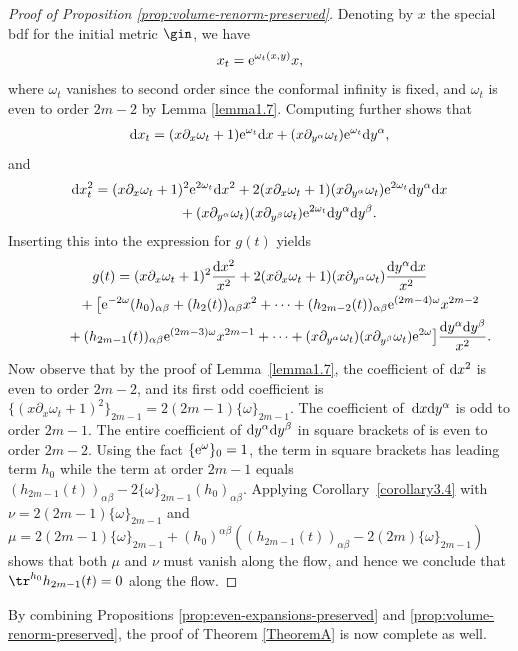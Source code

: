 \begin{proof}[Proof of Proposition \ref{prop:volume-renorm-preserved}]
Denoting by $x$ the special bdf for the initial metric $\gin$, we have
\begin{gather*}%
x_t = {\rm e}^{\omega_t(x,y)} x,
\end{gather*}
where $\omega_t$ vanishes to second order since the conformal infinity is fixed, and $\omega_t$ is even to order $2m-2$ by Lemma \ref{lemma1.7}.
Computing further shows that
\begin{gather*}%
{\rm d}x_t = (x\partial_x \omega_t + 1) {\rm e}^{\omega_t} {\rm d}x + (x \partial_{y^{\alpha}} \omega_t) {\rm e}^{\omega_t} {\rm d}y^{\alpha} ,
\end{gather*}
and
\begin{gather*}%
{\rm d}x_t^2 = (x\partial_x \omega_t + 1)^2 {\rm e}^{2\omega_t} {\rm d}x^2 + 2(x\partial_x \omega_t + 1) (x \partial_{y^{\alpha}} \omega_t)
{\rm e}^{2\omega_t} {\rm d}y^{\alpha} {\rm d}x\\
\hphantom{{\rm d}x_t^2 =}{} + (x \partial_{y^{\alpha}} \omega_t) (x \partial_{y^{\beta}} \omega_t) {\rm e}^{2\omega_t} {\rm d}y^{\alpha} {\rm d}y^{\beta}.
\end{gather*}
Inserting this into the expression for $g(t)$ yields
\begin{gather*}%
g(t) = ( x\partial_x \omega_t + 1)^2 \frac{{\rm d}x^2}{x^2} + 2( x\partial_x \omega_t + 1)( x \partial_{y^{\alpha}} \omega_t) \frac{{\rm d}y^{\alpha} {\rm d}x}{x^2} \\
\hphantom{g(t) =}{} + \big[ {\rm e}^{-2\omega} (h_0)_{\alpha \beta} + (h_2(t))_{\alpha \beta} x^2 + \cdots + (h_{2m-2}(t))_{\alpha \beta} {\rm e}^{(2m-4)\omega} x^{2m-2}\\
\hphantom{g(t) =}{} + (h_{2m-1}(t))_{\alpha \beta} {\rm e}^{(2m-3)\omega} x^{2m-1} + \cdots + (x \partial_{y^{\alpha}} \omega_t) (x \partial_{y^{\beta}} \omega_t) {\rm e}^{2\omega} \big] \frac{{\rm d}y^{\alpha} {\rm d}y^{\beta}}{x^2} .
\end{gather*}
Now observe that by the proof of Lemma~\ref{lemma1.7}, the coefficient of ${\rm d}x^2$ is even to order $2m-2$, and its first odd coefficient is $
\big\{ ( x\partial_x \omega_t + 1)^2 \big\}_{2m-1} = 2 (2m-1) \{\omega\}_{2m-1}$. The coefficient of~${\rm d}x {\rm d}y^{\alpha}$ is odd to order $2m-1$. The entire coefficient of ${\rm d}y^{\alpha} {\rm d}y^{\beta}$ in square brackets of is even to order $2m-2$. Using the fact $\{{\rm e}^{\omega}\}_0 = 1$, the term in square brackets has leading term $h_0$ while the term at order $2m-1$ equals $(h_{2m-1}(t))_{\alpha \beta} - 2 \{\omega\}_{2m-1}(h_0)_{\alpha \beta}$. Applying Corollary~\ref{corollary3.4} with $\nu = 2(2m-1) \{\omega\}_{2m-1}$ and $\mu = 2(2m-1) \{\omega\}_{2m-1} + (h_0)^{\alpha \beta}( (h_{2m-1}(t))_{\alpha \beta} - 2(2m)\{\omega\}_{2m-1}) $ shows that both $\mu$ and $\nu$ must vanish along the flow, and hence we conclude that $\tr^{h_0} h_{2m-1}(t) = 0$ along the flow.
\end{proof}

By combining Propositions \ref{prop:even-expansions-preserved} and \ref{prop:volume-renorm-preserved}, the proof of Theorem \ref{TheoremA} is now complete as well.

